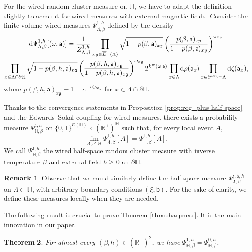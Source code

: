 \documentclass[11pt,a4paper]{article}
\numberwithin{equation}{section}
\theoremstyle{plain}
\newtheorem{Thm}{Theorem}[section]
\theoremstyle{definition}
\newtheorem{Rem}[Thm]{Remark}
\newcommand\fg{\mathfrak{g}}
\begin{document}
For the wired random cluster measure on $\mathbb H$, we have to adapt the definition slightly to account for wired measures with external magnetic fields. Consider the finite-volume wired measures $\Psi^{1,h}_{\Lambda, \beta}$ defined by the density
\begin{multline}\label{eq: random cluster explicit density half-space}
\mathrm{d}\Psi^{1,h}_{\Lambda,\beta}[(\omega, \mathsf a)]=\frac{1}{Z^{1,h}_{\Lambda,\beta}}\prod_{xy \in \overline E^+(\Lambda)} \sqrt{1-p(\beta,\mathsf a)_{xy}}\left(\frac{p(\beta,\mathsf a)_{xy}}{1-p(\beta,\mathsf a)_{xy}}\right)^{\omega_{xy}}\,
\\
 \prod_{x \in \Lambda \cap \partial \mathbb H}  \sqrt{1-p(\beta, h, \mathsf a)_{x\fg}}\left(\frac{p(\beta, h, \mathsf a)_{x\fg}}{1-p(\beta,h, \mathsf a)_{x\fg}}\right)^{\omega_{x\fg}}  2^{k^w(\omega,\mathsf{a})} 
\prod_{x\in \Lambda}\mathrm{d} \rho(\mathsf{a}_x) \prod_{x \in \partial^{\textup{ext},+} \Lambda} \mathrm{d}\zeta(\mathsf a_x),
\end{multline}
where $p(\beta,h,\mathsf a)_{x\mathfrak g} = 1-e^{-2\beta h\mathsf a_x}$ for $x \in \Lambda \cap \partial \mathbb H$. 

Thanks to the convergence statements in Proposition \ref{prop:reg_plus half-space} and the Edwards--Sokal coupling for wired measures, there exists a probability measure $\Psi^{1,h}_{\mathbb H, \beta}$ on $\{0,1\}^{E(\mathbb H)}\times (\mathbb R^+)^{\mathbb H}$ such that, for every local event $A$,
\begin{equation}
\lim_{\Lambda \nearrow \mathbb H} \Psi^{1,h}_{\Lambda,\beta}[A] = \Psi^{1,h}_{\mathbb H,\beta}[A].
\end{equation}
We call $\Psi^{1,h}_{\mathbb H,\beta}$ the wired half-space random cluster measure with inverse temperature $\beta$ and external field $h\geq 0$ on $\partial \mathbb H$.

\begin{Rem} \label{rem: half space general rc}
Observe that we could similarly define the half-space measure $\Psi^{\xi,\mathsf{b},h}_{\Lambda,\beta}$ on $\Lambda\subset \mathbb H$, with arbitrary boundary conditions $(\xi,\mathsf{b})$. For the sake of clarity, we define these measures locally when they are needed. 
\end{Rem}


The following result is crucial to prove Theorem \ref{thm:sharpness}. It is the main innovation in our paper.
\begin{Thm}\label{thm:half-space}
For almost every $(\beta,h) \in (\mathbb R^+)^2$, we have $\Psi^{1,h}_{\mathbb{H},\beta}= \Psi^{0,h}_{\mathbb{H},\beta}$.
\end{Thm}
\end{document}
